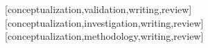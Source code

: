 \documentclass[spanish]{textolivre}
\begin{document}
\printbibliography\label{sec-bib}


\begin{contributors}
[conceptualization,validation,writing,review]
[conceptualization,investigation,writing,review]
[conceptualization,methodology,writing,review]
\end{contributors}
\end{document}
